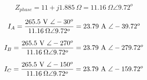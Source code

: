 $$Z_{phase} = 11 + j 1.885 \> \Omega = 11.16 \> \Omega \angle 9.72^o$$

\vskip 10pt

$$I_A = {{265.5 \hbox{ V } \angle -30^o} \over {11.16 \> \Omega \angle 9.72^o}} = 23.79 \hbox{ A } \angle -39.72^o$$

$$I_B = {{265.5 \hbox{ V } \angle -270^o} \over {11.16 \> \Omega \angle 9.72^o}} = 23.79 \hbox{ A } \angle -279.72^o$$

$$I_C = {{265.5 \hbox{ V } \angle -150^o} \over {11.16 \> \Omega \angle 9.72^o}} = 23.79 \hbox{ A } \angle -159.72^o$$




